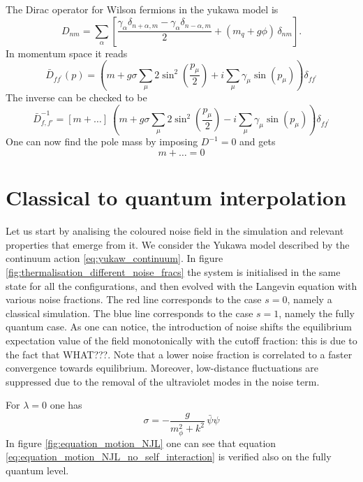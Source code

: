 The Dirac operator for Wilson fermions in the yukawa model is
\begin{equation*}
D_{n m}=\sum_\alpha\left[\frac{\gamma_\alpha \delta_{n+\alpha, m} - \gamma_\alpha \delta_{n-\alpha, m}}{2} + (m_q + g \phi) \, \delta_{n m}\right] .
\end{equation*}
In momentum space it reads
\begin{equation*}
\bar{D}_{f f^{\prime}}(p)=\left(m+ g \sigma \sum_\mu 2 \sin ^2\left(\frac{p_\mu}{2}\right)+i \sum_\mu \gamma_\mu \sin \left(p_\mu\right)\right) \delta_{f f^{\prime}}
\end{equation*}
The inverse can be checked to be 
\begin{equation*}
    \bar D_{f,f'} ^{-1} = \left[m + \dots\right] \ \left(m+ g \sigma \sum_\mu 2 \sin ^2\left(\frac{p_\mu}{2}\right) - i \sum_\mu \gamma_\mu \sin \left(p_\mu\right)\right) \delta_{f f^{\prime}}
\end{equation*}
One can now find the pole mass by imposing $D^{-1} = 0$ and gets 
\begin{equation*}
    m + \dots = 0
\end{equation*}

\section{Classical to quantum interpolation}
\label{sec:classical_to_quantum}

Let us start by analising the coloured noise field in the simulation and relevant properties that emerge from it. We consider the Yukawa model described by the continuum action \ref{eq:yukaw_continuum}.
In figure \ref{fig:thermalisation_different_noise_fracs} the system is initialised in the same state for all the configurations, and then evolved with the Langevin equation with various noise fractions. The red line corresponds to the case $s=0$, namely a classical simulation. The blue line corresponds to the case $s=1$, namely the fully quantum case. As one can notice, the introduction of noise shifts the equilibrium expectation value of the field monotonically with the cutoff fraction: this is due to the fact that WHAT???. Note that a lower noise fraction is correlated to a faster convergence towards equilibrium. Moreover, low-distance fluctuations are suppressed due to the removal of the ultraviolet modes in the noise term.

For $\lambda = 0$ one has
\begin{equation}
    \sigma = -\frac{g}{m_\phi^2 + k^2} \, \bar\psi \psi
    \label{eq:equation_motion_NJL_no_self_interaction}
\end{equation}
In figure \ref{fig:equation_motion_NJL} one can see that equation \eqref{eq:equation_motion_NJL_no_self_interaction} is verified also on the fully quantum level.

